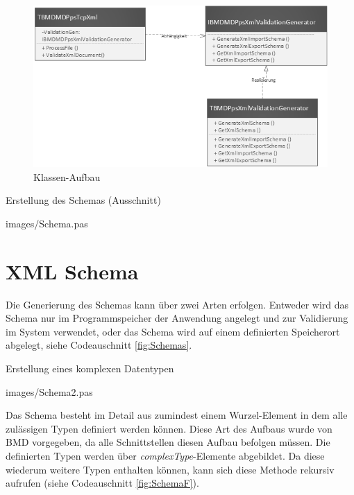 \begin{figure}
    \centering
    \includegraphics[width=.95\textwidth]{images/KlassenUML_black.png}
    \caption{Klassen-Aufbau}
    \label{fig:Klassenaufbau}
\end{figure}

 
\begin{program}
\caption{Erstellung des Schemas (Ausschnitt)}
 \label{fig:Schemas}
\lstset{language=Pascal, 
        basicstyle=\tiny\ttfamily, 
        numbers=left,
        numberstyle=\tiny, 
        stepnumber=5, 
        firstnumber=0,
        showstringspaces=false}
 {images/Schema.pas}
\end{program}

\section{XML Schema}
Die Generierung des Schemas kann über zwei Arten erfolgen. 
Entweder wird das Schema nur im Programmspeicher der Anwendung angelegt und zur Validierung im System verwendet, oder das Schema wird auf einem definierten Speicherort abgelegt, siehe Codeauschnitt \ref{fig:Schemas}.

\begin{program}
\caption{Erstellung eines komplexen Datentypen}
 \label{fig:SchemaF}
\lstset{language=Pascal, 
        basicstyle=\tiny\ttfamily, 
        numbers=left,
        numberstyle=\tiny, 
        stepnumber=5, 
        firstnumber=0,
        showstringspaces=false}
 {images/Schema2.pas}
\end{program}

Das Schema besteht im Detail aus zumindest einem Wurzel-Element in dem alle zulässigen Typen definiert werden können. Diese Art des Aufbaus wurde von BMD vorgegeben, da alle Schnittstellen diesen Aufbau befolgen müssen. Die definierten Typen werden über \emph{complexType}-Elemente abgebildet. Da diese wiederum weitere Typen enthalten können, kann sich diese Methode rekursiv aufrufen (siehe Codeauschnitt \ref{fig:SchemaF}).

